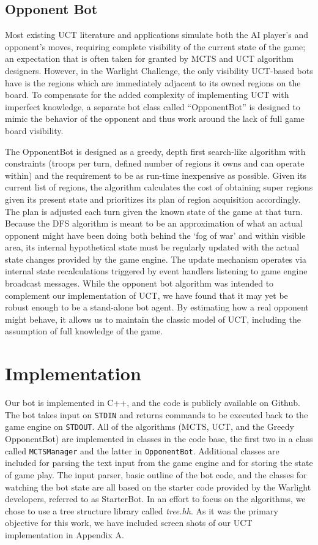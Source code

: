 \documentclass[a4paper,11pt]{article}
\newcommand{\code}[1]{\texttt{#1}}
\begin{document}
\subsection{Opponent Bot}\label{sec:oppbot}
Most existing UCT literature and applications simulate both the AI player's and opponent's
moves, requiring complete visibility of the current state of the game; an expectation that
is often taken for granted by MCTS and UCT algorithm designers. However, in the Warlight 
Challenge, the only visibility UCT-based bots have is the regions which are immediately 
adjacent to its owned regions on the board. To compensate for the added complexity of 
implementing UCT with imperfect knowledge, a separate bot class called ``OpponentBot'' is 
designed to mimic the behavior of the opponent and thus work around the lack of full game 
board visibility.

The OpponentBot is designed as a greedy, depth first search-like algorithm with constraints 
(troops per turn, defined number of regions it owns and can operate within) and the requirement 
to be as run-time inexpensive as possible. Given its current list of regions, the algorithm calculates
the cost of obtaining super regions given its present state and prioritizes its plan of
region acquisition accordingly. The plan is adjusted each turn given the known state of the 
game at that turn. Because the DFS algorithm is meant to be an approximation of what an
actual opponent might have been doing both behind the `fog of war' and within visible area, 
its internal hypothetical state must be regularly updated with the actual state changes
provided by the game engine.  The update mechanism operates via internal state recalculations 
triggered by event handlers listening to game engine broadcast messages. While the
opponent bot algorithm was intended to complement our implementation of UCT, we have found 
that it may yet be robust enough to be a stand-alone bot agent. By estimating how a real 
opponent might behave, it allows us to maintain the classic model of UCT, including the 
assumption of full knowledge of the game.

\section{Implementation}\label{sec:impl}
Our bot is implemented in C++, and the code is publicly available on Github\cite{github}.  
The bot takes input on \code{STDIN} and returns commands to be executed back to the game 
engine on \code{STDOUT}.  All of the algorithms (MCTS, UCT, and the Greedy OpponentBot) are 
implemented in classes in the code base, the first two in a class called \code{MCTSManager} 
and the latter in \code{OpponentBot}.  Additional classes are included for parsing the text 
input from the game engine and for storing the state of game play.  The input parser, basic 
outline of the bot code, and the classes for watching the bot state are all based on the 
starter code provided by the Warlight developers, referred to as StarterBot.  In an effort
to focus on the algorithms, we chose to use a tree structure library called \emph{tree.hh}\cite{treehh}.
As it was the primary objective for this work, we have included screen shots of our UCT
implementation in Appendix A.
\end{document}
